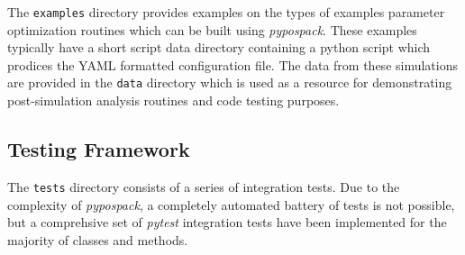 The \verb|examples| directory provides examples on the types of examples parameter optimization routines which can be built using \emph{pypospack}.  These examples typically have a short script data directory containing a python script which prodices the YAML formatted configuration file.  The data from these simulations are provided in the \verb|data| directory which is used as a resource for demonstrating post-simulation analysis routines and code testing purposes.

\subsection{Testing Framework}

The \verb|tests| directory consists of a series of integration tests.  Due to the complexity of \emph{pypospack}, a completely automated battery of tests is not possible, but a comprehsive set of \emph{pytest} integration tests have been implemented for the majority of classes and methods.
